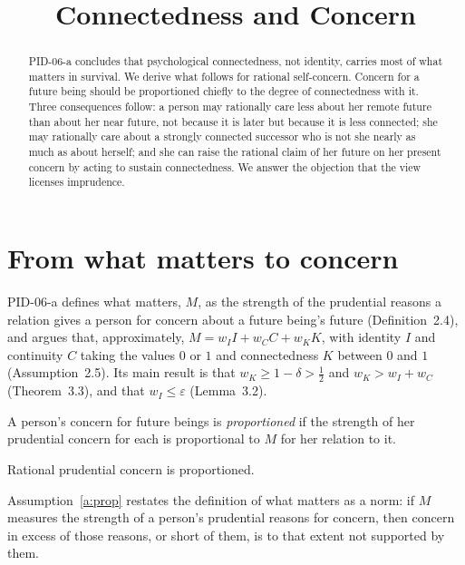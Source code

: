 \documentclass{situationist-preprint}
\title{Connectedness and Concern}
\begin{document}
\maketitle

\begin{abstract}
PID-06-a concludes that psychological connectedness, not identity, carries most of what matters in survival. We derive what follows for rational self-concern. Concern for a future being should be proportioned chiefly to the degree of connectedness with it. Three consequences follow: a person may rationally care less about her remote future than about her near future, not because it is later but because it is less connected; she may rationally care about a strongly connected successor who is not she nearly as much as about herself; and she can raise the rational claim of her future on her present concern by acting to sustain connectedness. We answer the objection that the view licenses imprudence.
\end{abstract}

\section{From what matters to concern}

PID-06-a defines what matters, $M$, as the strength of the prudential reasons a relation gives a person for concern about a future being's future (Definition~2.4), and argues that, approximately, $M = w_I I + w_C C + w_K K$, with identity $I$ and continuity $C$ taking the values $0$ or $1$ and connectedness $K$ between $0$ and $1$ (Assumption~2.5). Its main result is that $w_K \geq 1 - \delta > \tfrac12$ and $w_K > w_I + w_C$ (Theorem~3.3), and that $w_I \leq \varepsilon$ (Lemma~3.2).

\begin{definition}\label{d:prop}
A person's concern for future beings is \emph{proportioned} if the strength of her prudential concern for each is proportional to $M$ for her relation to it.
\end{definition}

\begin{assumption}\label{a:prop}
Rational prudential concern is proportioned.
\end{assumption}

Assumption~\ref{a:prop} restates the definition of what matters as a norm: if $M$ measures the strength of a person's prudential reasons for concern, then concern in excess of those reasons, or short of them, is to that extent not supported by them.
\end{document}
